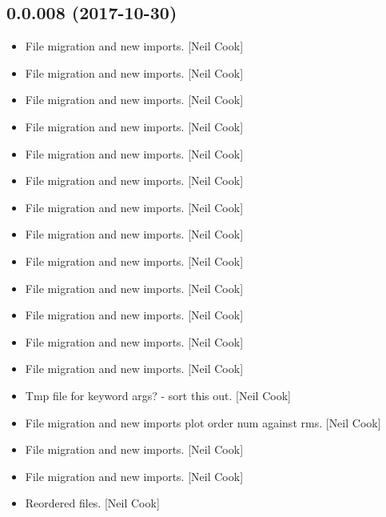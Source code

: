 \documentclass[a4paper,10pt,english]{report}
\begin{document}
\subsection{0.0.008 (2017-10-30)}
\label{\detokenize{misc/changelog:id543}}\begin{itemize}
\item {} 
File migration and new imports. {[}Neil Cook{]}

\item {} 
File migration and new imports. {[}Neil Cook{]}

\item {} 
File migration and new imports. {[}Neil Cook{]}

\item {} 
File migration and new imports. {[}Neil Cook{]}

\item {} 
File migration and new imports. {[}Neil Cook{]}

\item {} 
File migration and new imports. {[}Neil Cook{]}

\item {} 
File migration and new imports. {[}Neil Cook{]}

\item {} 
File migration and new imports. {[}Neil Cook{]}

\item {} 
File migration and new imports. {[}Neil Cook{]}

\item {} 
File migration and new imports. {[}Neil Cook{]}

\item {} 
File migration and new imports. {[}Neil Cook{]}

\item {} 
File migration and new imports. {[}Neil Cook{]}

\item {} 
File migration and new imports. {[}Neil Cook{]}

\item {} 
Tmp file for keyword args? - sort this out. {[}Neil Cook{]}

\item {} 
File migration and new imports plot order num against rms. {[}Neil Cook{]}

\item {} 
File migration and new imports. {[}Neil Cook{]}

\item {} 
File migration and new imports. {[}Neil Cook{]}

\item {} 
Reordered files. {[}Neil Cook{]}

\end{itemize}
\end{document}
